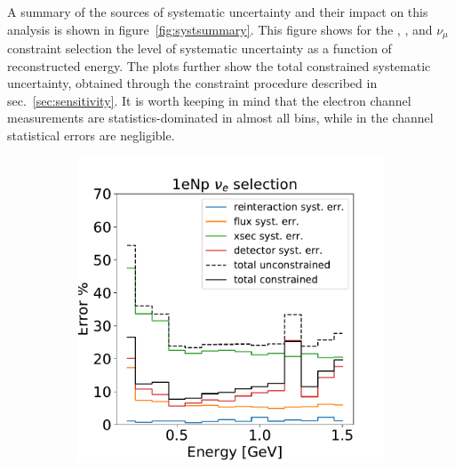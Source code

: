 A summary of the sources of systematic uncertainty and their impact on this analysis is shown in figure~\ref{fig:systsummary}. This figure shows for the \npsel, \zpsel, and $\nu_{\mu}$ constraint selection the level of systematic uncertainty as a function of reconstructed energy. The plots further show the total constrained systematic uncertainty, obtained through the constraint procedure described in sec.~\ref{sec:sensitivity}. It is worth keeping in mind that the electron channel measurements are statistics-dominated in almost all bins, while in the \numu channel statistical errors are negligible.

\begin{figure}[H] 
\begin{center}
    \begin{subfigure}[b]{0.32\textwidth}
    \centering
    \includegraphics[width=1.00\textwidth]{Systematics/1eNp_syst_summary.pdf}
    \caption{\label{fig:systsummary:np}\npsel}
    \end{subfigure}
    \begin{subfigure}[b]{0.32\textwidth}
    \centering

\end{subfigure}
\end{center}
\end{figure}
